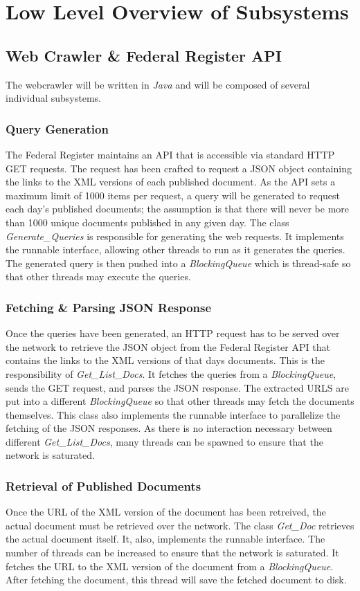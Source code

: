 \documentclass{sig-alternate-05-2015}
\begin{document}
\section{Low Level Overview of Subsystems}
\subsection{Web Crawler \& Federal Register API}
The webcrawler will be written in \emph{Java} and will be composed of several individual subsystems. 
\subsubsection{Query Generation}
The Federal Register maintains an API that is accessible via standard HTTP GET requests. The request has been crafted to request a JSON object containing the links to the XML versions of each published document. As the API sets a maximum limit of 1000 items per request, a query will be generated to request each day's published documents; the assumption is that there will never be more than 1000 unique documents published in any given day. The class \emph{Generate\_Queries} is responsible for generating the web requests. It implements the runnable interface, allowing other threads to run as it generates the queries. The generated query is then pushed into a \emph{BlockingQueue} which is thread-safe so that other threads may execute the queries.

\subsubsection{Fetching \& Parsing JSON Response}
Once the queries have been generated, an HTTP request has to be served over the network to retrieve the JSON object from the Federal Register API that contains the links to the XML versions of that days documents. This is the responsibility of \emph{Get\_List\_Docs}. It fetches the queries from a \emph{BlockingQueue}, sends the GET request, and parses the JSON response. The extracted URLS are put into a different \emph{BlockingQueue} so that other threads may fetch the documents themselves. This class also implements the runnable interface to parallelize the fetching of the JSON responses. As there is no interaction necessary between different \emph{Get\_List\_Docs}, many threads can be spawned to ensure that the network is saturated.

\subsubsection{Retrieval of Published Documents}
Once the URL of the XML version of the document has been retreived, the actual document must be retrieved over the network. The class \emph{Get\_Doc} retrieves the actual document itself. It, also, implements the runnable interface. The number of threads can be increased to ensure that the network is saturated. It fetches the URL to the XML version of the document from a \emph{BlockingQueue}. After fetching the document, this thread will save the fetched document to disk.
\end{document}

